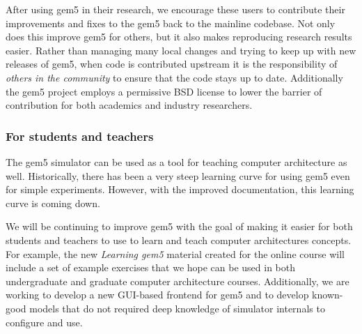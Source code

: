 After using gem5 in their research, we encourage these users to contribute their improvements and fixes to the gem5 back to the mainline codebase.
Not only does this improve gem5 for others, but it also makes reproducing research results easier.
Rather than managing many local changes and trying to keep up with new releases of gem5, when code is contributed upstream it is the responsibility of \emph{others in the community} to ensure that the code stays up to date.
Additionally the gem5 project employs a permissive BSD license to lower the barrier of contribution for both academics and industry researchers.

\subsubsection{For students and teachers}

The gem5 simulator can be used as a tool for teaching computer architecture as well.
Historically, there has been a very steep learning curve for using gem5 even for simple experiments.
However, with the improved documentation, this learning curve is coming down.

We will be continuing to improve gem5 with the goal of making it easier for both students and teachers to use to learn and teach computer architectures concepts.
For example, the new \emph{Learning gem5} material created for the online course will include a set of example exercises that we hope can be used in both undergraduate and graduate computer architecture courses.
Additionally, we are working to develop a new GUI-based frontend for gem5 and to develop known-good models that do not required deep knowledge of simulator internals to configure and use.
